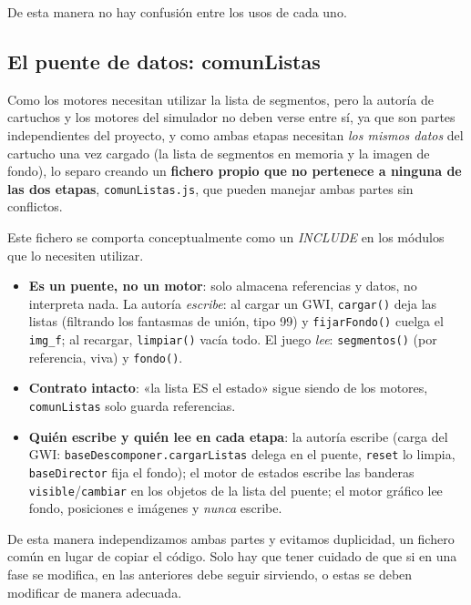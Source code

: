   De esta manera no hay confusión entre los usos de cada uno.
  
\subsection{El puente de datos: comunListas}
\label{subsec:comunListas}
  
Como los motores necesitan utilizar la lista de segmentos, pero la autoría de cartuchos y los motores del simulador no deben verse entre sí, ya que son partes independientes del proyecto, y como ambas etapas necesitan \emph{los mismos datos} del cartucho una vez cargado
  (la lista de segmentos en memoria y la imagen de fondo), lo separo creando un \textbf{fichero propio que no pertenece a ninguna de las dos etapas}, \texttt{comunListas.js}, que pueden manejar ambas partes sin conflictos.
  
Este fichero se comporta conceptualmente como un \emph{INCLUDE} en los módulos que lo necesiten utilizar.
  
  \begin{itemize}
  	\item \textbf{Es un puente, no un motor}: solo almacena referencias y datos, no interpreta
  	nada. La autoría \emph{escribe}: al cargar un GWI, \texttt{cargar()} deja las listas
  	(filtrando los fantasmas de unión, tipo 99) y \texttt{fijarFondo()} cuelga el
  	\texttt{img\_f}; al recargar, \texttt{limpiar()} vacía todo. El juego \emph{lee}:
  	\texttt{segmentos()} (por referencia, viva) y \texttt{fondo()}.
  	
  	\item \textbf{Contrato intacto}: «la lista ES el estado» sigue siendo de los motores, 
  	 \texttt{comunListas} solo guarda referencias.
  	
  	\item \textbf{Quién escribe y quién lee en cada etapa}: la autoría escribe (carga del
  	GWI: \texttt{baseDescomponer.cargarListas} delega en el puente, \texttt{reset} lo
  	limpia, \texttt{baseDirector} fija el fondo); el motor de estados escribe las banderas
  	\texttt{visible}/\texttt{cambiar} en los objetos de la lista del puente; el motor
  	gráfico lee fondo, posiciones e imágenes y \emph{nunca} escribe.
  \end{itemize}
  
De esta manera independizamos ambas partes y evitamos duplicidad, un fichero común en lugar de copiar el código. Solo hay que tener cuidado de que si en una fase se modifica, en las anteriores debe seguir sirviendo, o estas se deben modificar de manera adecuada.
  
